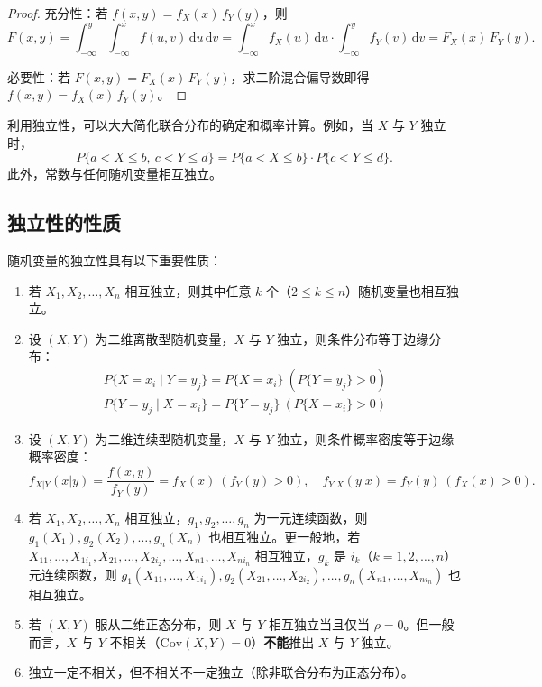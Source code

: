 \documentclass[lang=cn,11pt]{elegantbook}
\begin{document}
\begin{proof}
充分性：若 $f(x,y) = f_X(x)\,f_Y(y)$，则
\[
F(x,y) = \int_{-\infty}^{y}\int_{-\infty}^{x}f(u,v)\,\mathrm{d}u\,\mathrm{d}v = \int_{-\infty}^{x}f_X(u)\,\mathrm{d}u \cdot \int_{-\infty}^{y}f_Y(v)\,\mathrm{d}v = F_X(x)\,F_Y(y).
\]

必要性：若 $F(x,y) = F_X(x)\,F_Y(y)$，求二阶混合偏导数即得 $f(x,y) = f_X(x)\,f_Y(y)$。
\end{proof}

\begin{note}
利用独立性，可以大大简化联合分布的确定和概率计算。例如，当 $X$ 与 $Y$ 独立时，
\[
P\{a < X \leqslant b,\ c < Y \leqslant d\} = P\{a < X \leqslant b\} \cdot P\{c < Y \leqslant d\}.
\]
此外，常数与任何随机变量相互独立。
\end{note}

\subsection{独立性的性质}

\begin{property}\label{prop:independence-implications}
随机变量的独立性具有以下重要性质：
\begin{enumerate}
    \item 若 $X_1, X_2, \dots, X_n$ 相互独立，则其中任意 $k$ 个（$2 \leqslant k \leqslant n$）随机变量也相互独立。
    \item 设 $(X,Y)$ 为二维离散型随机变量，$X$ 与 $Y$ 独立，则条件分布等于边缘分布：
    \begin{align*}
    P\{X = x_i \mid Y = y_j\} = P\{X = x_i\}\ (P\{Y = y_j\} > 0)\\
     P\{Y = y_j \mid X = x_i\} = P\{Y = y_j\}\ (P\{X = x_i\} > 0)
    \end{align*}
    \item 设 $(X,Y)$ 为二维连续型随机变量，$X$ 与 $Y$ 独立，则条件概率密度等于边缘概率密度：
    \[
    f_{X|Y}(x|y) = \frac{f(x,y)}{f_Y(y)} = f_X(x)\ (f_Y(y) > 0), \quad f_{Y|X}(y|x) = f_Y(y)\ (f_X(x) > 0).
    \]
    \item 若 $X_1, X_2, \dots, X_n$ 相互独立，$g_1, g_2, \dots, g_n$ 为一元连续函数，则 $g_1(X_1), g_2(X_2), \dots, g_n(X_n)$ 也相互独立。更一般地，若 $X_{11}, \dots, X_{1i_1}, X_{21}, \dots, X_{2i_2}, \dots, X_{n1}, \dots, X_{ni_n}$ 相互独立，$g_k$ 是 $i_k$（$k=1,2,\dots,n$）元连续函数，则 $g_1(X_{11}, \dots, X_{1i_1}), g_2(X_{21}, \dots, X_{2i_2}), \dots, g_n(X_{n1}, \dots, X_{ni_n})$ 也相互独立。
    \item 若 $(X,Y)$ 服从二维正态分布，则 $X$ 与 $Y$ 相互独立当且仅当 $\rho = 0$。但一般而言，$X$ 与 $Y$ 不相关（$\mathrm{Cov}(X,Y) = 0$）\textbf{不能}推出 $X$ 与 $Y$ 独立。
    \item 独立一定不相关，但不相关不一定独立（除非联合分布为正态分布）。
\end{enumerate}
\end{property}
\end{document}
